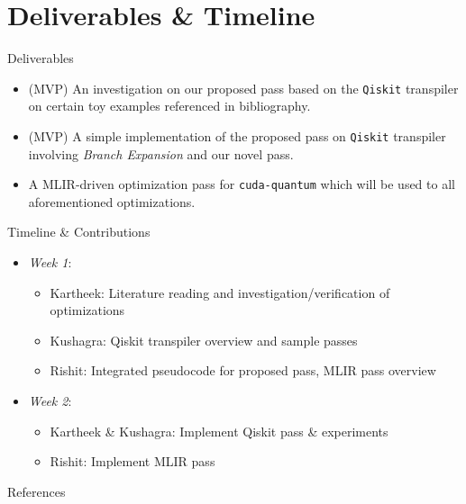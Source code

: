 \documentclass[10pt]{beamer}
\begin{document}

\section{Deliverables \& Timeline}
\begin{frame}{Deliverables}
  \begin{itemize}
    \item (MVP) An investigation on our proposed pass based on the \texttt{Qiskit} transpiler on certain toy examples referenced in bibliography.

    \item (MVP) A simple implementation of the proposed pass on \texttt{Qiskit} transpiler involving \emph{Branch Expansion} and our novel pass.

    \item A MLIR-driven optimization pass for \texttt{cuda-quantum} which will be used to all aforementioned optimizations.
  \end{itemize}
\end{frame}

\begin{frame}{Timeline \& Contributions}
  \begin{itemize}
    \item \emph{Week 1}:
      \begin{itemize}
        \item Kartheek: Literature reading and investigation/verification of optimizations
        \item Kushagra: Qiskit transpiler overview and sample passes
        \item Rishit: Integrated pseudocode for proposed pass, MLIR pass overview
      \end{itemize}

    \item \emph{Week 2}:
      \begin{itemize}
        \item Kartheek \& Kushagra: Implement Qiskit pass \& experiments
        \item Rishit: Implement MLIR pass
      \end{itemize}

  \end{itemize}
\end{frame}

\begin{frame}[allowframebreaks]{References}
  
  
\end{frame}



\end{document}

